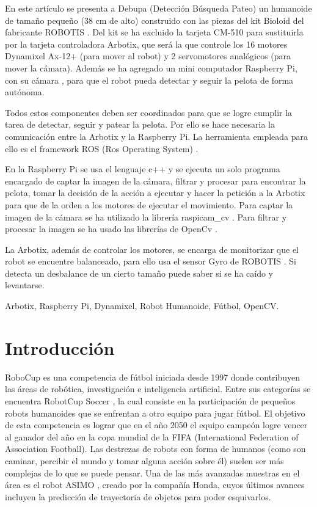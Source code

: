 \documentclass[tikz,conference, letterpaper]{IEEEtranMC1}
\begin{document}
\begin{abstractSP}
En este artículo se presenta a Debupa (Detección Búsqueda Pateo) un humanoide de tamaño pequeño (38 cm de alto) construido con las piezas del kit Bioloid \cite{robotics} del fabricante ROBOTIS \cite{robotics1}. Del kit se ha excluido la tarjeta CM-510 para sustituirla por la tarjeta controladora Arbotix, que será la que controle los 16 motores Dynamixel Ax-12+ (para mover al robot) y 2 servomotores analógicos (para mover la cámara). Además se ha agregado un mini computador Raspberry Pi, con su cámara \cite{raspberrycam}, para que el robot pueda detectar y seguir la pelota de forma autónoma. 

Todos estos componentes deben ser coordinados para que se logre cumplir la tarea de detectar, seguir y patear la pelota. Por ello se hace necesaria la comunicación entre la Arbotix y la Raspberry Pi. La herramienta empleada para ello es el framework ROS (Ros Operating System) \cite{ros}.

En la Raspberry Pi se usa el lenguaje c++ y se ejecuta un solo programa encargado de captar la imagen de la cámara, filtrar y procesar para encontrar la pelota, tomar la decisión de la acción a ejecutar y hacer la petición a la Arbotix para que de la orden a los motores de ejecutar el movimiento. Para captar la imagen de la cámara se ha utilizado la librería raspicam\_cv \cite{camara}. Para filtrar y procesar la imagen se ha usado las librerías de OpenCv \cite{opencv}. 

La Arbotix, además de controlar los motores, se encarga de monitorizar que el robot se encuentre balanceado, para ello usa el sensor Gyro de ROBOTIS \cite{gyro}. Si detecta un desbalance de un cierto tamaño puede saber si se ha caído y levantarse. 

\end{abstractSP}

\begin{IEEEkeywordsSP}
Arbotix, Raspberry Pi, Dynamixel, Robot Humanoide, Fútbol, OpenCV.
\end{IEEEkeywordsSP}


\IEEEpeerreviewmaketitle

\section{Introducci\'on}
RoboCup \cite{robotcup} es una competencia de fútbol iniciada desde 1997 donde contribuyen las áreas de robótica, investigación e inteligencia artificial. Entre sus categorías se encuentra RobotCup Soccer \cite{robotcupsoccer}, la cual consiste en la participación de pequeños robots humanoides que se enfrentan a otro equipo para jugar fútbol. El objetivo de esta competencia es lograr que en el año 2050 el equipo campeón logre vencer al ganador del año en la copa mundial de la FIFA (International Federation of Association Football). Las destrezas de robots con forma de humanos (como son caminar, percibir el mundo y tomar alguna acción sobre él) suelen ser más complejas de lo que se puede pensar. Una de las más avanzadas muestras en el área es el robot ASIMO \cite{asimo}, creado por la compañía Honda, cuyos últimos avances incluyen la predicción de trayectoria de objetos para poder esquivarlos.
\end{document}
